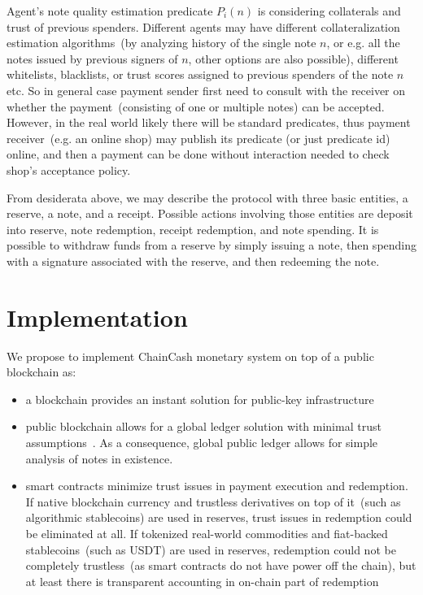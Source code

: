 \documentclass{ifcolog}
\newcommand{\cc}{ChainCash}
\begin{document}
Agent's note quality estimation predicate $P_i(n)$ is considering collaterals and trust of previous spenders. Different agents may have different 
collateralization estimation algorithms~(by analyzing history of the single note $n$, or e.g. all the notes issued by previous signers of $n$, other options are also possible), different whitelists, blacklists, or trust scores assigned to previous spenders of the note $n$ etc. So in general case payment sender first need to consult with the receiver on whether the payment~(consisting of one or multiple notes) can be accepted. However, in the real world likely there will be standard predicates, thus payment receiver~(e.g. an online shop) may publish its predicate (or just predicate id) online, and then a payment can be done without interaction needed to check shop's acceptance policy.

From desiderata above, we may describe the protocol with three basic entities, a reserve, a note, and a receipt. Possible actions involving those entities are deposit into reserve, note redemption,
 receipt redemption, and note spending. It is possible to withdraw funds from a reserve by simply issuing a note, then spending with a signature
associated with the reserve, and then redeeming the note.

\section{Implementation}
\label{sec-impl}

We propose to implement \cc{} monetary system on top of a public blockchain as:

\begin{itemize}
  \item{} a blockchain provides an instant solution for public-key infrastructure
  \item{} public blockchain allows for a global ledger solution with minimal trust assumptions~\cite{kya}. As a consequence, global public ledger allows for simple analysis of notes in existence.
  \item{} smart contracts minimize trust issues in payment execution and redemption. If native blockchain currency and trustless derivatives on top of it~(such as algorithmic stablecoins) are used in reserves, trust issues in redemption could be eliminated at all. If tokenized real-world commodities and fiat-backed stablecoins~(such as USDT) are used in reserves, redemption could not be completely trustless~(as smart contracts do not have power off the chain), but at least there is transparent accounting in on-chain part of redemption
\end{itemize}
\end{document}
